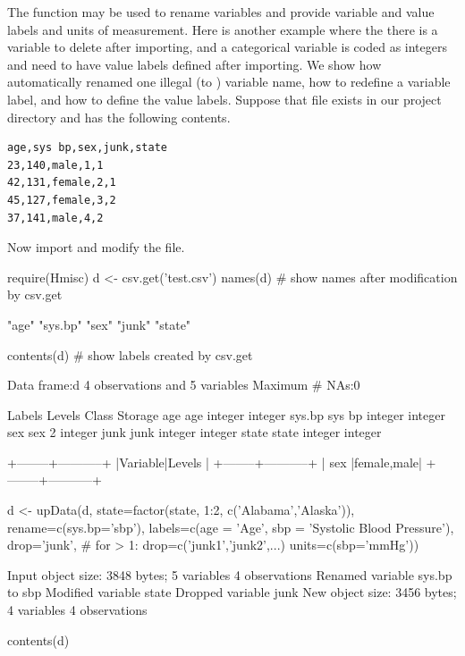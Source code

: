 The   function may be used to rename variables
and provide variable and value labels and units of measurement.
Here is another example where the there is a  variable to
delete after importing, and a categorical variable is coded as
integers and need to have value labels defined after
importing.  We show how  automatically renamed one illegal
(to \R) variable name, how to redefine a variable label, and how to
define the value labels.  Suppose that file  exists in
our project directory and has the following contents.
{\small\begin{verbatim}
age,sys bp,sex,junk,state
23,140,male,1,1
42,131,female,2,1
45,127,female,3,2
37,141,male,4,2
\end{verbatim}}
Now import and modify the file.
\begin{Schunk}
\begin{Sinput}
require(Hmisc)
d <- csv.get('test.csv')
names(d)   # show names after modification by csv.get
\end{Sinput}
\begin{Soutput}
[1] "age"    "sys.bp" "sex"    "junk"   "state" 
\end{Soutput}
\begin{Sinput}
contents(d)  # show labels created by csv.get
\end{Sinput}
\begin{Soutput}

Data frame:d	4 observations and 5 variables    Maximum # NAs:0


       Labels Levels   Class Storage
age       age        integer integer
sys.bp sys bp        integer integer
sex       sex      2         integer
junk     junk        integer integer
state   state        integer integer

+--------+-----------+
|Variable|Levels     |
+--------+-----------+
|   sex  |female,male|
+--------+-----------+
\end{Soutput}
\begin{Sinput}
d <- upData(d,
            state=factor(state, 1:2, c('Alabama','Alaska')),
            rename=c(sys.bp='sbp'),
            labels=c(age = 'Age',
                     sbp = 'Systolic Blood Pressure'),
            drop='junk',   # for > 1: drop=c('junk1','junk2',...)
   units=c(sbp='mmHg'))
\end{Sinput}
\begin{Soutput}
Input object size:	 3848 bytes;	 5 variables	 4 observations
Renamed variable	 sys.bp 	to sbp 
Modified variable	 state 
Dropped variable	 junk 
New object size:	 3456 bytes;	 4 variables	 4 observations
\end{Soutput}
\begin{Sinput}
contents(d)
\end{Sinput}
\begin{Soutput}


\end{Soutput}
\end{Schunk}
